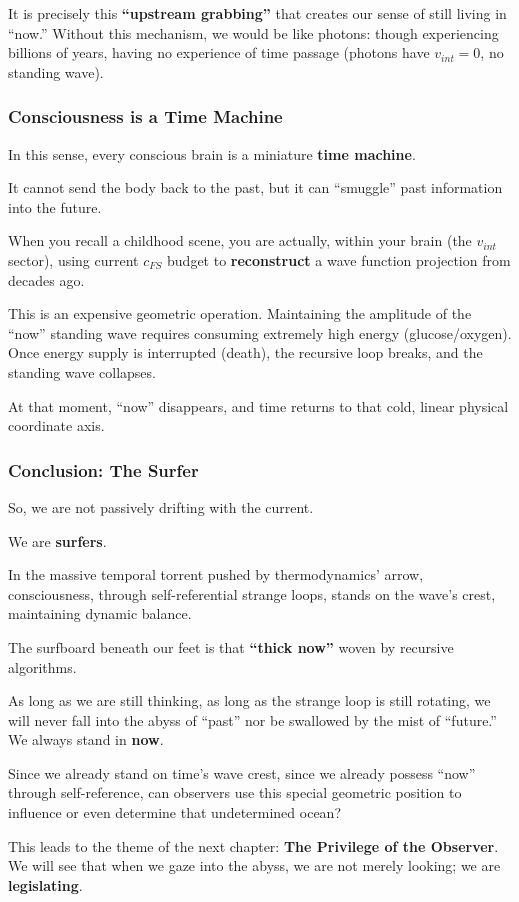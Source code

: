 It is precisely this \textbf{``upstream grabbing''} that creates our sense of still living in ``now.'' Without this mechanism, we would be like photons: though experiencing billions of years, having no experience of time passage (photons have $v_{int}=0$, no standing wave).

\subsubsection{Consciousness is a Time Machine}

In this sense, every conscious brain is a miniature \textbf{time machine}.

It cannot send the body back to the past, but it can ``smuggle'' past information into the future.

When you recall a childhood scene, you are actually, within your brain (the $v_{int}$ sector), using current $c_{FS}$ budget to \textbf{reconstruct} a wave function projection from decades ago.

This is an expensive geometric operation. Maintaining the amplitude of the ``now'' standing wave requires consuming extremely high energy (glucose/oxygen). Once energy supply is interrupted (death), the recursive loop breaks, and the standing wave collapses.

At that moment, ``now'' disappears, and time returns to that cold, linear physical coordinate axis.

\subsubsection{Conclusion: The Surfer}

So, we are not passively drifting with the current.

We are \textbf{surfers}.

In the massive temporal torrent pushed by thermodynamics' arrow, consciousness, through self-referential strange loops, stands on the wave's crest, maintaining dynamic balance.

The surfboard beneath our feet is that \textbf{``thick now''} woven by recursive algorithms.

As long as we are still thinking, as long as the strange loop is still rotating, we will never fall into the abyss of ``past'' nor be swallowed by the mist of ``future.'' We always stand in \textbf{now}.

Since we already stand on time's wave crest, since we already possess ``now'' through self-reference, can observers use this special geometric position to influence or even determine that undetermined ocean?

This leads to the theme of the next chapter: \textbf{The Privilege of the Observer}. We will see that when we gaze into the abyss, we are not merely looking; we are \textbf{legislating}.

